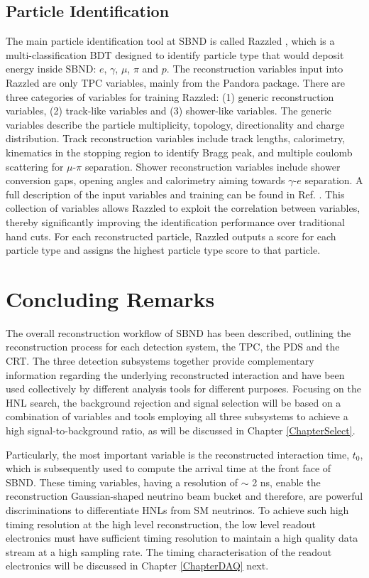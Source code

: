 \subsection{Particle Identification}
\label{sec:razzled}

The main particle identification tool at SBND is called Razzled \cite{razzled}, which is a multi-classification BDT designed to identify particle type that would deposit energy inside SBND: $e$, $\gamma$, $\mu$, $\pi$ and $p$.
The reconstruction variables input into Razzled are only TPC variables, mainly from the Pandora package.
There are three categories of variables for training Razzled: (1) generic reconstruction variables, (2) track-like variables and (3) shower-like variables.
The generic variables describe the particle multiplicity, topology, directionality and charge distribution.
Track reconstruction variables include track lengths, calorimetry, kinematics in the stopping region to identify Bragg peak, and multiple coulomb scattering for $\mu$-$\pi$ separation.
Shower reconstruction variables include shower conversion gaps, opening angles and calorimetry aiming towards $\gamma$-$e$ separation.
A full description of the input variables and training can be found in Ref. \cite{EdPhD}.
This collection of variables allows Razzled to exploit the correlation between variables, thereby significantly improving the identification performance over traditional hand cuts.
For each reconstructed particle, Razzled outputs a score for each particle type and assigns the highest particle type score to that particle.

\section{Concluding Remarks}
\label{sec:reco_concluding_remarks}

The overall reconstruction workflow of SBND has been described, outlining the reconstruction process for each detection system, the TPC, the PDS and the CRT.
The three detection subsystems together provide complementary information regarding the underlying reconstructed interaction and have been used collectively by different analysis tools for different purposes.
Focusing on the HNL search, the background rejection and signal selection will be based on a combination of variables and tools employing all three subsystems to achieve a high signal-to-background ratio, as will be discussed in Chapter \ref{ChapterSelect}.

Particularly, the most important variable is the reconstructed interaction time, $t_0$, which is subsequently used to compute the arrival time at the front face of SBND.
These timing variables, having a resolution of $\sim$ 2 ns, enable the reconstruction Gaussian-shaped neutrino beam bucket and therefore, are powerful discriminations to differentiate HNLs from SM neutrinos.
To achieve such high timing resolution at the high level reconstruction, the low level readout electronics must have sufficient timing resolution to maintain a high quality data stream at a high sampling rate.
The timing characterisation of the readout electronics will be discussed in Chapter \ref{ChapterDAQ} next.


